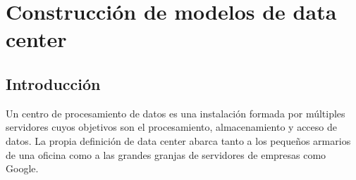 








\section{Construcción de modelos de data center}

\subsection{Introducción}
Un centro de procesamiento de datos es una instalación formada por múltiples servidores cuyos objetivos son el procesamiento, almacenamiento y acceso de datos. La propia definición de data center abarca tanto a los pequeños armarios de una oficina  como a las grandes granjas de servidores de empresas como Google. 

